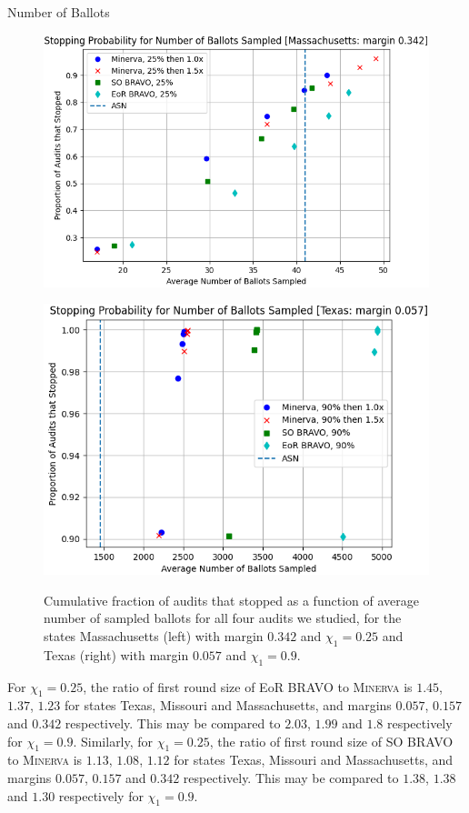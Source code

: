 \documentclass[final]{beamer}
\newcommand{\Minerva}{\textsc{Minerva}\xspace}
\newcommand{\BRAVO}{\textsc{BRAVO}\xspace}
\newlength{\colwidth}
\begin{document}
\begin{frame}[t]
\begin{columns}[t]
\begin{column}{\colwidth}
\begin{block}{Number of Ballots}
\begin{figure}[h]
\centering
\begin{minipage}{.49\textwidth}
\includegraphics[width=1\textwidth]{massachusetts25.png}
\label{fig:mass_25}
\end{minipage}
\begin{minipage}{.49\textwidth}
\includegraphics[width=1\textwidth]{texas90.png}
\label{fig:texas_90}
\end{minipage}
\caption{Cumulative fraction of audits that stopped as a function of average number of sampled ballots for all four audits we studied, for the states Massachusetts (left) with margin $0.342$ and $\chi_1=0.25$ and Texas (right) with margin $0.057$ and $\chi_1=0.9$.}
\end{figure}

For $\chi_1=0.25$, the ratio of first round size of EoR \BRAVO to \Minerva is $1.45$, $1.37$, $1.23$ for states Texas, Missouri and Massachusetts, and margins $0.057$, $0.157$ and $0.342$ respectively. This may be compared to $2.03$, $1.99$ and $1.8$ respectively for $\chi_1=0.9$. Similarly, for $\chi_1=0.25$, the ratio of first round size of SO \BRAVO to \Minerva is $1.13$, $1.08$, $1.12$ for states Texas, Missouri and Massachusetts, and margins $0.057$, $0.157$ and $0.342$ respectively. This may be compared to $1.38$, $1.38$ and $1.30$ respectively for $\chi_1=0.9$. 


\end{block}
\end{column}
\end{columns}
\end{frame}
\end{document}
